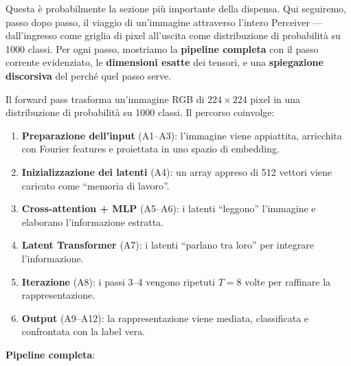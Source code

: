 \documentclass[12pt,a4paper]{article}
\begin{document}
Questa \`e probabilmente la sezione pi\`u importante della dispensa. Qui seguiremo, passo dopo passo, il viaggio di un'immagine attraverso l'intero Perceiver --- dall'ingresso come griglia di pixel all'uscita come distribuzione di probabilit\`a su 1000 classi. Per ogni passo, mostriamo la \textbf{pipeline completa} con il passo corrente evidenziato, le \textbf{dimensioni esatte} dei tensori, e una \textbf{spiegazione discorsiva} del perch\'e quel passo serve.

Il forward pass trasforma un'immagine RGB di $224 \times 224$ pixel in una distribuzione di probabilit\`a su 1000 classi. Il percorso coinvolge:
\begin{enumerate}[label=\arabic*.]
    \item \textbf{Preparazione dell'input} (A1--A3): l'immagine viene appiattita, arricchita con Fourier features e proiettata in uno spazio di embedding.
    \item \textbf{Inizializzazione dei latenti} (A4): un array appreso di 512 vettori viene caricato come ``memoria di lavoro''.
    \item \textbf{Cross-attention + MLP} (A5--A6): i latenti ``leggono'' l'immagine e elaborano l'informazione estratta.
    \item \textbf{Latent Transformer} (A7): i latenti ``parlano tra loro'' per integrare l'informazione.
    \item \textbf{Iterazione} (A8): i passi 3--4 vengono ripetuti $T = 8$ volte per raffinare la rappresentazione.
    \item \textbf{Output} (A9--A12): la rappresentazione viene mediata, classificata e confrontata con la label vera.
\end{enumerate}

\textbf{Pipeline completa}:
\begin{center}
\small
{}
\end{center}
\end{document}
